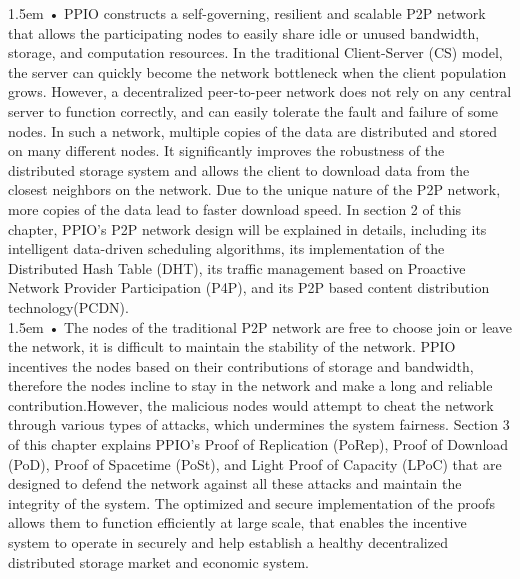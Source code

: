 \documentclass[10pt,a4paper]{article}
\begin{document}
\hangindent 1.5em
\noindent   
• PPIO constructs a self-governing, resilient and scalable P2P network that allows the participating nodes to easily share idle or unused bandwidth, storage, and computation resources. In the traditional Client-Server (CS) model, the server can quickly become the network bottleneck when the client population grows. However, a decentralized peer-to-peer network does not rely on any central server to function correctly, and can easily tolerate the fault and failure of some nodes. In such a network, multiple copies of the data are distributed and stored on many different nodes. It significantly improves the robustness of the distributed storage system and allows the client to download data from the closest neighbors on the network. Due to the unique nature of the P2P network, more copies of the data lead to faster download speed. In section 2 of this chapter, PPIO's P2P network design will be explained in details, including its intelligent data-driven scheduling algorithms, its implementation of the Distributed Hash Table (DHT), its traffic management based on Proactive Network Provider Participation (P4P), and its P2P based content distribution technology(PCDN).
\vspace{-0.6em}
\\ 

\hangindent 1.5em
\noindent   
• The nodes of the traditional P2P network are free to choose join or leave the network, it is difficult to maintain the stability of the network. PPIO incentives the nodes based on their contributions of storage and bandwidth, therefore the nodes incline to stay in the network and make a long and reliable contribution.\cite{article1}However, the malicious nodes would attempt to cheat the network through various types of attacks, which undermines the system fairness. Section 3 of this chapter explains PPIO's Proof of Replication (PoRep), Proof of Download (PoD), Proof of Spacetime (PoSt), and Light Proof of Capacity (LPoC) that are designed to defend the network against all these attacks and maintain the integrity of the system. The optimized and secure implementation of the proofs allows them to function efficiently at large scale, that enables the incentive system to operate in securely and help establish a healthy decentralized distributed storage market and economic system.
\vspace{-0.6em}
\\ 
\end{document}
